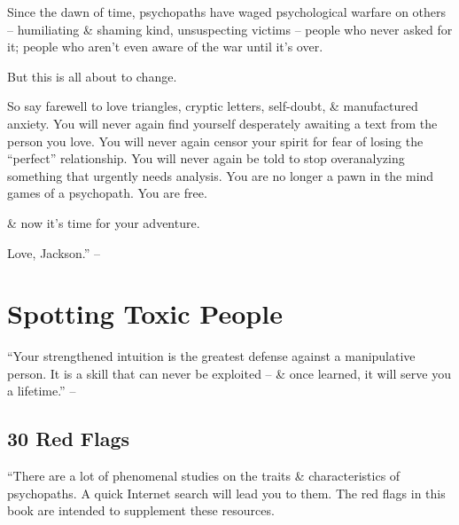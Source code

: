 \documentclass{article}
\numberwithin{equation}{section}
\begin{document}
Since the dawn of time, psychopaths have waged psychological warfare on others -- humiliating \& shaming kind, unsuspecting victims -- people who never asked for it; people who aren't even aware of the war until it's over.

But this is all about to change.

So say farewell to love triangles, cryptic letters, self-doubt, \& manufactured anxiety. You will never again find yourself desperately awaiting a text from the person you love. You will never again censor your spirit for fear of losing the ``perfect'' relationship. You will never again be told to stop overanalyzing something that urgently needs analysis. You are no longer a pawn in the mind games of a psychopath. You are free.

\& now it's time for your adventure.

Love, Jackson.'' -- \cite[pp. 7--9]{MacKenzie2015}


\section{Spotting Toxic People}
``Your strengthened intuition is the greatest defense against a manipulative person. It is a skill that can never be exploited -- \& once learned, it will serve you a lifetime.'' -- \cite[p. 10]{MacKenzie2015}

\subsection{30 Red Flags}
``There are a lot of phenomenal studies on the traits \& characteristics of psychopaths. A quick Internet search will lead you to them. The red flags in this book are intended to supplement these resources.
\end{document}
